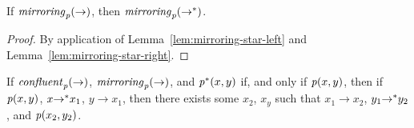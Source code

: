 \documentclass[numbers,10pt,preprint\ifanon ,nocopyrightspace\fi]{sigplanconf}
\begin{document}
\begin{lemma}
  \label{lem:mirroring-star}
  If $\mathit{mirroring}_{\mathit{p}}(\rightarrow)$, then
  $\mathit{mirroring}_{\mathit{p}}({\rightarrow}^*)$.
\end{lemma}
\begin{proof}
  By application of Lemma~\ref{lem:mirroring-star-left} and
  Lemma~\ref{lem:mirroring-star-right}.
\end{proof}

\begin{lemma}
  \label{lem:pre-starred-confluence-transitive-reflexive}
  If $\mathit{confluent}_{\mathit{p}}(\rightarrow)$,
  $\mathit{mirroring}_{\mathit{p}}(\rightarrow)$, and
  ${\mathit{p}}^*(x,y)$ if, and only if $\mathit{p}(x,y)$,
  then if $\mathit{p}(x,y)$, $x{\rightarrow}^* x_1$, $y\rightarrow
  x_1$, then there exists some $x_2$, $x_y$ such that
  $x_1\rightarrow x_2$, $y_1{\rightarrow}^* y_2$, and
  $\mathit{p}(x_2,y_2)$.
\end{lemma}
\end{document}
